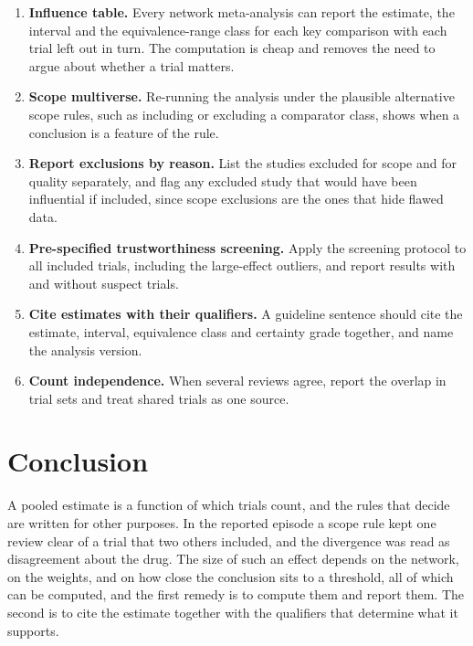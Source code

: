\documentclass[11pt]{article}
\theoremstyle{definition}
\begin{document}
\begin{enumerate}
\item \textbf{Influence table.} Every network meta-analysis can report the estimate, the interval and the equivalence-range class for each key comparison with each trial left out in turn. The computation is cheap and removes the need to argue about whether a trial matters.
\item \textbf{Scope multiverse.} Re-running the analysis under the plausible alternative scope rules, such as including or excluding a comparator class, shows when a conclusion is a feature of the rule.
\item \textbf{Report exclusions by reason.} List the studies excluded for scope and for quality separately, and flag any excluded study that would have been influential if included, since scope exclusions are the ones that hide flawed data.
\item \textbf{Pre-specified trustworthiness screening.} Apply the screening protocol to all included trials, including the large-effect outliers, and report results with and without suspect trials.
\item \textbf{Cite estimates with their qualifiers.} A guideline sentence should cite the estimate, interval, equivalence class and certainty grade together, and name the analysis version.
\item \textbf{Count independence.} When several reviews agree, report the overlap in trial sets and treat shared trials as one source.
\end{enumerate}

\section{Conclusion}

A pooled estimate is a function of which trials count, and the rules that decide are written for other purposes. In the reported episode a scope rule kept one review clear of a trial that two others included, and the divergence was read as disagreement about the drug. The size of such an effect depends on the network, on the weights, and on how close the conclusion sits to a threshold, all of which can be computed, and the first remedy is to compute them and report them. The second is to cite the estimate together with the qualifiers that determine what it supports.
\end{document}
